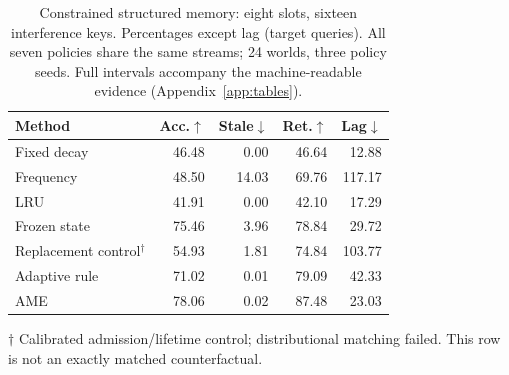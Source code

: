 \begin{table}[t]
\centering\small
\caption{Constrained structured memory: eight slots, sixteen interference keys. Percentages except lag (target queries). All seven policies share the same streams; 24 worlds, three policy seeds. Full intervals accompany the machine-readable evidence (Appendix~\ref{app:tables}).}\label{tab:main}
\begin{tabular}{lrrrr}\toprule
Method & Acc.$\uparrow$ & Stale$\downarrow$ & Ret.$\uparrow$ & Lag$\downarrow$\\\midrule
Fixed decay & 46.48 & 0.00 & 46.64 & 12.88\\
Frequency & 48.50 & 14.03 & 69.76 & 117.17\\
LRU & 41.91 & 0.00 & 42.10 & 17.29\\
Frozen state & 75.46 & 3.96 & 78.84 & 29.72\\
Replacement control$^{\dagger}$ & 54.93 & 1.81 & 74.84 & 103.77\\
Adaptive rule & 71.02 & 0.01 & 79.09 & 42.33\\
AME & 78.06 & 0.02 & 87.48 & 23.03\\
\bottomrule\end{tabular}
\par\vspace{2pt}\footnotesize $\dagger$ Calibrated admission/lifetime control; distributional matching failed. This row is not an exactly matched counterfactual.
\end{table}
